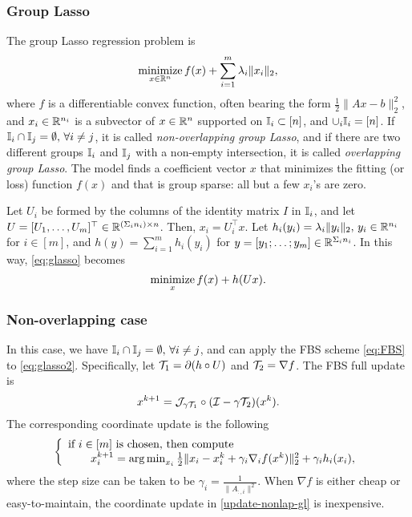 \subsubsection{Group Lasso}\label{sec:glasso}
The group Lasso regression problem \cite{YL2006GrpLasso} is 
\begin{equation}\label{eq:glasso}
\Min_{x\in\RR^n}  f(x)+\sum_{i=1}^m\lambda_i\|x_i\|_2,
\end{equation} 
where $ f$ is a differentiable convex function, often bearing the form $\frac{1}{2}\|Ax-b\|_2^2$, and $x_i\in \mathbb{R}^{n_i}$ is a subvector of $x\in\mathbb{R}^n$ supported on $\mathbb{I}_i\subset [n]$, and $\cup_i \mathbb{I}_i= [n]$. If $\mathbb{I}_i\cap \mathbb{I}_j =\emptyset, \,\forall i\neq j$, it is called \emph{non-overlapping group Lasso}, and if there are two different groups $\mathbb{I}_i$ and $\mathbb{I}_j$ with a non-empty intersection, it is called \emph{overlapping group Lasso}. The model finds a coefficient vector $x$ that minimizes the fitting (or loss) function $f(x)$ and that is group sparse: all but a few $x_i$'s are zero.  

Let $U_i$ be formed by the columns of the identity matrix $I$ in $\mathbb{I}_i$, and let $U=[U_1,\ldots,U_m]^\top\in\mathbb{R}^{(\Sigma_i n_i)\times n}$. Then, $x_i=U_i^\top x$. Let $h_i(y_i)=\lambda_i\|y_i\|_2,\,y_i\in\mathbb{R}^{n_i}$ for $i \in [m]$, and $h(y)=\sum_{i=1}^m h_i(y_i)$ for $y=[y_1;\ldots;y_m]\in\mathbb{R}^{\Sigma_i n_i}$. In this way, \eqref{eq:glasso} becomes
\begin{equation}\label{eq:glasso2}
\Min_x f(x)+h(Ux).
\end{equation}

\subsubsection*{Non-overlapping case~\cite{YL2006GrpLasso}} In this case, we have $\mathbb{I}_i\cap \mathbb{I}_j =\emptyset, \,\forall i\neq j$, and can apply the FBS scheme \eqref{eq:FBS} to \eqref{eq:glasso2}. Specifically, let ${\mathcal{T}}_1=\partial (h\circ U)$ and ${\mathcal{T}}_2=\nabla f$. The FBS full update is 
$$x^{k+1}={\mathcal{J}}_{\gamma {\mathcal{T}}_1}\circ({\mathcal{I}}-\gamma{\mathcal{T}}_2)(x^k).$$
The corresponding coordinate update is the following
\begin{equation}\label{update-nonlap-gl}
{\left\{
\begin{array}{l}
\text{if }i \in [m]\text{ is chosen, then compute}\\
\qquad x_i^{k+1}=\argmin_{x_i}\frac{1}{2}\|x_i-x_i^k+\gamma_i \nabla_i f(x^k)\|_2^2+ \gamma_i h_i(x_i),\\
\end{array}
\right.
}\end{equation}
where the step size can be taken to be $\gamma_i=\frac{1}{\|A_{:,i}\|^2}$. When $\nabla f$ is either cheap or easy-to-maintain,  the coordinate update in \eqref{update-nonlap-gl} is inexpensive.

